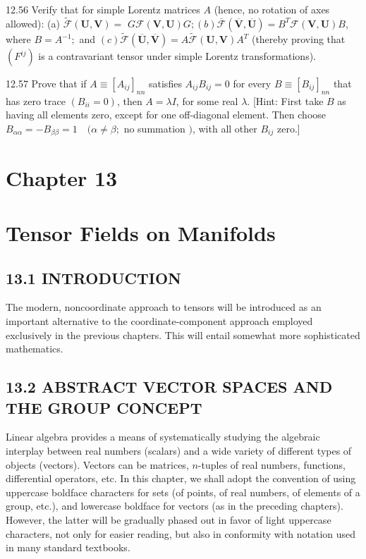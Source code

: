 \documentclass[10pt]{article}
\begin{document}
12.56 Verify that for simple Lorentz matrices $A$ (hence, no rotation of axes allowed): (a) $\tilde{\mathscr{F}}(\mathbf{U}, \mathbf{V})=$ $G \mathscr{F}(\mathbf{V}, \mathbf{U}) G ;(b) \overline{\mathscr{F}}(\overline{\mathbf{V}}, \overline{\mathbf{U}})=B^{T} \mathscr{F}(\mathbf{V}, \mathbf{U}) B$, where $B=A^{-1} ;$ and $(c) \tilde{\mathscr{F}}(\overline{\mathbf{U}}, \overline{\mathbf{V}})=A \tilde{\mathscr{F}}(\mathbf{U}, \mathbf{V}) A^{T}$ (thereby proving that $\left(F^{i j}\right)$ is a contravariant tensor under simple Lorentz transformations).

12.57 Prove that if $A \equiv\left[A_{i j}\right]_{n n}$ satisfies $A_{i j} B_{i j}=0$ for every $B \equiv\left[B_{i j}\right]_{n n}$ that has zero trace $\left(B_{i i}=0\right)$, then $A=\lambda I$, for some real $\lambda$. [Hint: First take $B$ as having all elements zero, except for one off-diagonal element. Then choose $B_{\alpha \alpha}=-B_{\beta \beta}=1 \quad(\alpha \neq \beta ;$ no summation $)$, with all other $B_{i j}$ zero.]

\section*{Chapter 13}
\section*{Tensor Fields on Manifolds}
\subsection*{13.1 INTRODUCTION}
The modern, noncoordinate approach to tensors will be introduced as an important alternative to the coordinate-component approach employed exclusively in the previous chapters. This will entail somewhat more sophisticated mathematics.

\subsection*{13.2 ABSTRACT VECTOR SPACES AND THE GROUP CONCEPT}
Linear algebra provides a means of systematically studying the algebraic interplay between real numbers (scalars) and a wide variety of different types of objects (vectors). Vectors can be matrices, $n$-tuples of real numbers, functions, differential operators, etc. In this chapter, we shall adopt the convention of using uppercase boldface characters for sets (of points, of real numbers, of elements of a group, etc.), and lowercase boldface for vectors (as in the preceding chapters). However, the latter will be gradually phased out in favor of light uppercase characters, not only for easier reading, but also in conformity with notation used in many standard textbooks.
\end{document}
